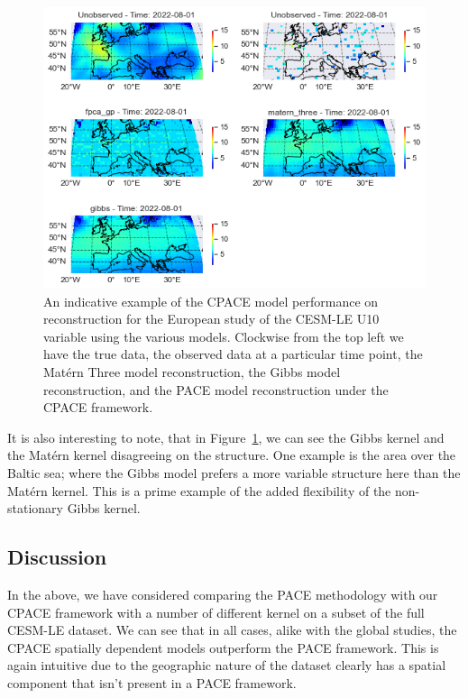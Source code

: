 \begin{figure}
	\centering
	\includegraphics[width=\textwidth]{full_ex_u10_eur}
	\caption{An indicative example of the CPACE model performance on reconstruction for the European study of the CESM-LE U10 variable using the various models. Clockwise from the top left we have the true data, the observed data at a particular time point, the Mat\'ern Three model reconstruction, the Gibbs model reconstruction, and the PACE model reconstruction under the CPACE framework.}
	\label{fig:full_ex_u10_eur}
\end{figure}

It is also interesting to note, that in Figure~\ref{fig:full_ex_u10_eur}, we can see the Gibbs kernel and the Mat\'ern kernel disagreeing on the structure.
One example is the area over the Baltic sea;  where the Gibbs model prefers a more variable structure here than the Mat\'ern kernel.
This is a prime example of the added flexibility of the non-stationary Gibbs kernel. 

\subsection{Discussion \label{ssec:cesm_dis_eur}}
In the above, we have considered comparing the PACE methodology with our CPACE framework with a number of different kernel on a subset of the full CESM-LE dataset.
We can see that in all cases, alike with the global studies, the CPACE spatially dependent models outperform the PACE framework.
This is again intuitive due to the geographic nature of the dataset clearly has a spatial component that isn't present in a PACE framework.

